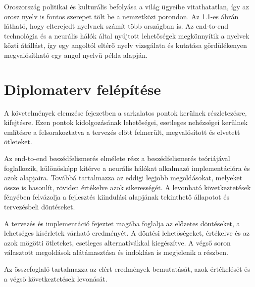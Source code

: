 Oroszország politikai és kulturális befolyása a világ ügyeibe vitathatatlan, így az orosz nyelv is fontos szerepet tölt be a nemzetközi porondon. Az 1.1-es ábrán látható, hogy elterejedt nyelvnek számít több országban is. Az end-to-end technológia és a neurális hálók által nyújtott lehetőségek megkönnyítik a nyelvek közti átállást, így egy angoltól eltérő nyelv vizsgálata és kutatása gördülékenyen megvalósítható egy angol nyelvű példa alapján.

\section{Diplomaterv felépítése}

A követelmények elemzése fejezetben a sarkalatos pontok kerülnek részletezésre, kifejtésre. Ezen pontok kidolgozásának lehetőségei, esetleges nehézségei kerülnek említésre a felsorakoztatva a tervezés előtt felmerült, megvalósított és elvetett ötleteket.

Az end-to-end beszédfelismerés elmélete rész a beszédfelismerés teóriájával foglalkozik, különösképp kitérve a neurális hálókat alkalmazó implementációra és azok alapjaira. Továbbá tartalmazza az eddigi legjobb megoldásokat, melyeket össze is hasonlít, röviden értékelve azok sikerességét. A levonható következtetések fényében felvázolja a fejlesztés kiindulási alapjának tekinthető állapotot és tervezésbeli döntéseket.

A tervezés és implementáció fejeztet magába foglalja az előzetes döntéseket, a lehetséges kísérletek várható eredményét. A döntési lehetőségeket, értékelve és az azok mögötti ötleteket, esetleges alternatívákkal kiegészítve. A végső soron választott megoldások alátámasztása és indoklása is megjelenik a részben.

Az összefoglaló tartalmazza az elért eredmények bemutatását, azok értékelését és a végső következtetések levonását.
